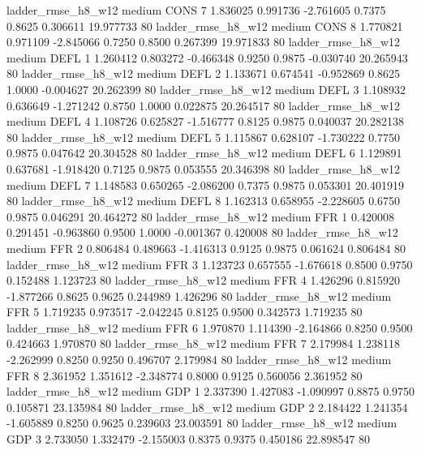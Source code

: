     ladder_rmse_h8_w12     medium     CONS                 7  1.836025 0.991736 -2.761605 0.7375 0.8625  0.306611   19.977733 80
    ladder_rmse_h8_w12     medium     CONS                 8  1.770821 0.971109 -2.845066 0.7250 0.8500  0.267399   19.971833 80
    ladder_rmse_h8_w12     medium     DEFL                 1  1.260412 0.803272 -0.466348 0.9250 0.9875 -0.030740   20.265943 80
    ladder_rmse_h8_w12     medium     DEFL                 2  1.133671 0.674541 -0.952869 0.8625 1.0000 -0.004627   20.262399 80
    ladder_rmse_h8_w12     medium     DEFL                 3  1.108932 0.636649 -1.271242 0.8750 1.0000  0.022875   20.264517 80
    ladder_rmse_h8_w12     medium     DEFL                 4  1.108726 0.625827 -1.516777 0.8125 0.9875  0.040037   20.282138 80
    ladder_rmse_h8_w12     medium     DEFL                 5  1.115867 0.628107 -1.730222 0.7750 0.9875  0.047642   20.304528 80
    ladder_rmse_h8_w12     medium     DEFL                 6  1.129891 0.637681 -1.918420 0.7125 0.9875  0.053555   20.346398 80
    ladder_rmse_h8_w12     medium     DEFL                 7  1.148583 0.650265 -2.086200 0.7375 0.9875  0.053301   20.401919 80
    ladder_rmse_h8_w12     medium     DEFL                 8  1.162313 0.658955 -2.228605 0.6750 0.9875  0.046291   20.464272 80
    ladder_rmse_h8_w12     medium      FFR                 1  0.420008 0.291451 -0.963860 0.9500 1.0000 -0.001367    0.420008 80
    ladder_rmse_h8_w12     medium      FFR                 2  0.806484 0.489663 -1.416313 0.9125 0.9875  0.061624    0.806484 80
    ladder_rmse_h8_w12     medium      FFR                 3  1.123723 0.657555 -1.676618 0.8500 0.9750  0.152488    1.123723 80
    ladder_rmse_h8_w12     medium      FFR                 4  1.426296 0.815920 -1.877266 0.8625 0.9625  0.244989    1.426296 80
    ladder_rmse_h8_w12     medium      FFR                 5  1.719235 0.973517 -2.042245 0.8125 0.9500  0.342573    1.719235 80
    ladder_rmse_h8_w12     medium      FFR                 6  1.970870 1.114390 -2.164866 0.8250 0.9500  0.424663    1.970870 80
    ladder_rmse_h8_w12     medium      FFR                 7  2.179984 1.238118 -2.262999 0.8250 0.9250  0.496707    2.179984 80
    ladder_rmse_h8_w12     medium      FFR                 8  2.361952 1.351612 -2.348774 0.8000 0.9125  0.560056    2.361952 80
    ladder_rmse_h8_w12     medium      GDP                 1  2.337390 1.427083 -1.090997 0.8875 0.9750  0.105871   23.135984 80
    ladder_rmse_h8_w12     medium      GDP                 2  2.184422 1.241354 -1.605889 0.8250 0.9625  0.239603   23.003591 80
    ladder_rmse_h8_w12     medium      GDP                 3  2.733050 1.332479 -2.155003 0.8375 0.9375  0.450186   22.898547 80
